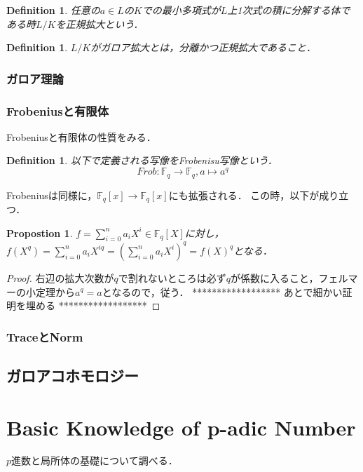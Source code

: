 \documentclass{ujarticle}
\newtheorem{dfn}[thm]{Definition}
\newtheorem{prop}[thm]{Propostion}
\begin{document}
\begin{dfn}
 任意の$a \in L$の$K$での最小多項式が$L$上1次式の積に分解する体である時$L/K$を正規拡大という．
\end{dfn}

\begin{dfn}
 $L/K$がガロア拡大とは，分離かつ正規拡大であること．
\end{dfn}
\subsubsection{ガロア理論}
\label{sub:ガロア理論}

\subsubsection{Frobeniusと有限体}
\label{sub:Frobeniusと有限体}
Frobeniusと有限体の性質をみる．
\begin{dfn}
  以下で定義される写像をFrobenisu写像という．
  \begin{equation*}
    Frob:\mathbb{F}_q　\to \mathbb{F}_q　,a \mapsto a^q
  \end{equation*}
\end{dfn}
Frobeniusは同様に，$\mathbb{F}_q[x] \to \mathbb{F}_q[x]$にも拡張される．
この時，以下が成り立つ．
\begin{prop}
 $f = \sum_{i=0}^n a_iX^i \in \mathbb{F}_q[X]$に対し，
 $f(X^q)=\sum_{i=0}^n a_iX^{iq} = (\sum_{i=0}^n a_iX^{i})^q=f(X)^q$となる．
\end{prop}
\begin{proof}
 右辺の拡大次数が$q$で割れないところは必ず$q$が係数に入ること，フェルマーの小定理から$a^q=a$となるので，従う．
 ******************
  あとで細かい証明を埋める
  ******************
\end{proof}

\subsubsection{TraceとNorm}
\label{sub:TraceとNorm}

\subsection{ガロアコホモロジー}
\label{sub:ガロアコホモロジー}


\section{Basic Knowledge of p-adic Number}
\label{sec:p-adic Number}
$p$進数と局所体の基礎について調べる．
\end{document}
